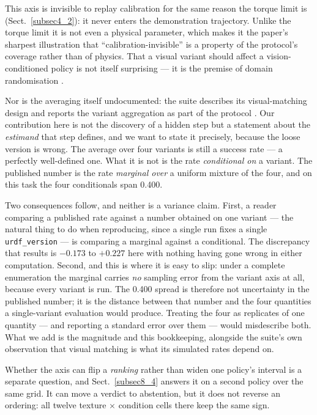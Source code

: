 \documentclass[pdflatex,iicol,sn-apa]{sn-jnl}
\theoremstyle{remark}
\begin{document}
This axis is invisible to replay calibration for the same reason the torque limit is
(Sect.~\ref{subsec4_2}): it never enters the demonstration trajectory. Unlike the torque limit it is
not even a physical parameter, which makes it the paper's sharpest illustration that
``calibration-invisible'' is a property of the protocol's coverage rather than of physics. That a
visual variant should affect a vision-conditioned policy is not itself surprising --- it is the
premise of domain randomisation \citep{tobin2017domain, peng2018sim}.

Nor is the averaging itself undocumented: the suite describes its visual-matching design and reports
the variant aggregation as part of the protocol \citep{li2024simpler}. Our contribution here is not
the discovery of a hidden step but a statement about the \emph{estimand} that step defines, and we
want to state it precisely, because the loose version is wrong. The average over four variants is
still a success rate --- a perfectly well-defined one. What it is not is the rate \emph{conditional
on} a variant. The published number is the rate \emph{marginal over} a uniform mixture of the four,
and on this task the four conditionals span 0.400.

Two consequences follow, and neither is a variance claim. First, a reader comparing a published rate
against a number obtained on one variant --- the natural thing to do when reproducing, since a
single run fixes a single \texttt{urdf\_version} --- is comparing a marginal against a conditional.
The discrepancy that results is $-0.173$ to $+0.227$ here with nothing having gone wrong in either
computation. Second, and this is where it is easy to slip: under a complete enumeration the marginal
carries \emph{no} sampling error from the variant axis at all, because every variant is run. The
0.400 spread is therefore not uncertainty in the published number; it is the distance between that
number and the four quantities a single-variant evaluation would produce. Treating the four as
replicates of one quantity --- and reporting a standard error over them --- would misdescribe both.
What we add is the magnitude and this bookkeeping, alongside the suite's own observation that visual
matching is what its simulated rates depend on.

Whether the axis can flip a \emph{ranking} rather than widen one policy's interval is a separate
question, and Sect.~\ref{subsec8_4} answers it on a second policy over the same grid. It can move a
verdict to abstention, but it does not reverse an ordering: all twelve texture $\times$ condition
cells there keep the same sign.
\end{document}
